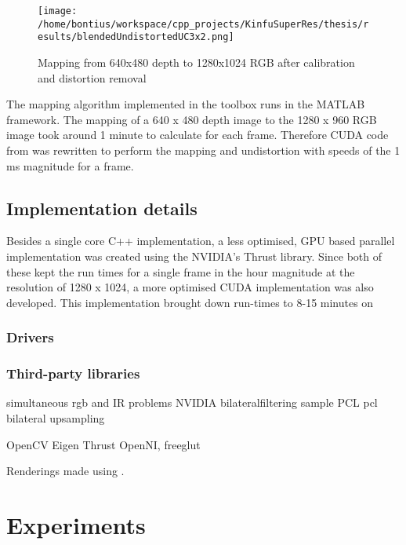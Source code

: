 \documentclass{ucl_thesis}
\begin{document}
\begin{figure}[h!]\centering
        \texttt{[image: /home/bontius/workspace/cpp\_projects/KinfuSuperRes/thesis/results/blendedUndistortedUC3x2.png]}
        \caption{Mapping from 640x480 depth to 1280x1024 RGB after calibration and distortion removal}
        \label{fig:final_calib}
\end{figure}

\par The mapping algorithm implemented in the toolbox runs in the MATLAB framework. The mapping of a 640 x 480 depth image to the 1280 x 960 RGB image took around 1 minute to calculate for each frame. Therefore CUDA code from \citep{kinect_lua} was rewritten to perform the mapping and undistortion with speeds of the 1 ms magnitude for a frame.

\section{Implementation details}
\label{sec:implementation_details}

\par Besides a single core C++ implementation, a less optimised, GPU based parallel implementation was created using the NVIDIA's Thrust library. Since both of these kept the run times for a single frame in the hour magnitude at the resolution of 1280 x 1024, a more optimised CUDA implementation was also developed. This implementation brought down run-times to 8-15 minutes on 

\subsection{Drivers}
\subsection{Third-party libraries}
simultaneous rgb and IR problems
NVIDIA bilateralfiltering sample
PCL
 pcl bilateral upsampling
 \citep{DCBGridStereo}
 
 OpenCV
 Eigen
 Thrust
 OpenNI, freeglut
 
Renderings made using \citep{Meshlab}.

\chapter{Experiments}
\label{chp:validation}
\end{document}
